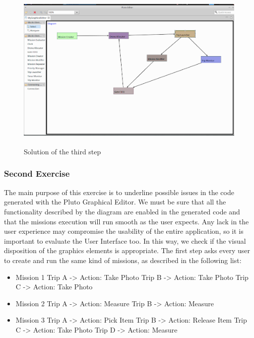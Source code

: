 \begin{figure}[H]
  \centering
  \includegraphics[width=\linewidth, height=8cm]{pictures/thirdStep.png}
  \caption{Solution of the third step}
  \label{fig:thirdStep}
\end{figure}

\subsubsection{Second Exercise}

The main purpose of this exercise is to underline possible issues in the code generated with the Pluto Graphical Editor. We must be sure that all the functionality described by the diagram are enabled in the generated code and that the missions execution will run smooth as the user expects. Any lack in the user experience may compromise the usability of the entire application, so it is important to evaluate the User Interface too. In this way, we check if the visual disposition of the graphics elements is appropriate.
The first step asks every user to create and run the same kind of missions, as described in the following list:

\begin{itemize}
\item Mission 1
	\subitem Trip A -> Action: Take Photo
    \subitem Trip B -> Action: Take Photo
    \subitem Trip C -> Action: Take Photo
\item Mission 2
	\subitem Trip A -> Action: Measure
    \subitem Trip B -> Action: Measure
\item Mission 3
	\subitem Trip A -> Action: Pick Item
    \subitem Trip B -> Action: Release Item
    \subitem Trip C -> Action: Take Photo
    \subitem Trip D -> Action: Measure
\end{itemize}

